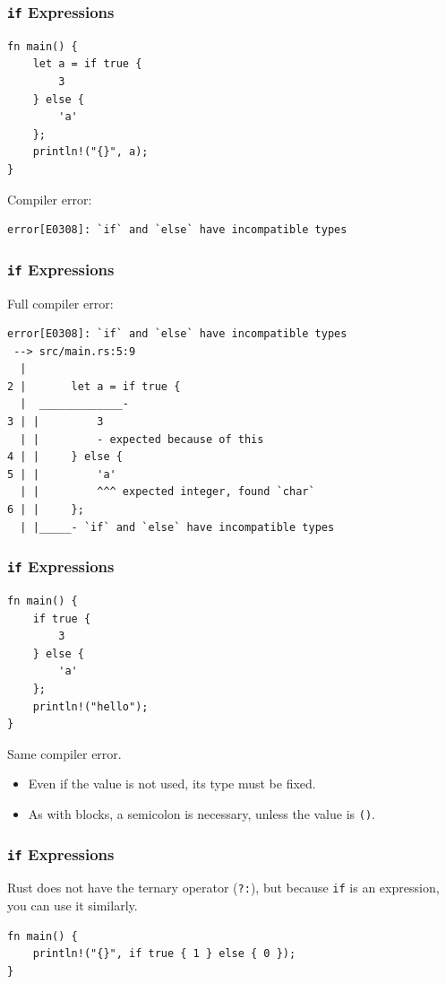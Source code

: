 \begin{frame}[fragile]
    \frametitle{\texttt{if} Expressions}
    \begin{verbatim}
fn main() {
    let a = if true {
        3
    } else {
        'a'
    };
    println!("{}", a);
}
    \end{verbatim}
    \pause
    \vfill
    Compiler error:
    \begin{verbatim}
error[E0308]: `if` and `else` have incompatible types
    \end{verbatim}
\end{frame}

\begin{frame}[fragile]
    \frametitle{\texttt{if} Expressions}
    Full compiler error:
    \begin{verbatim}
error[E0308]: `if` and `else` have incompatible types
 --> src/main.rs:5:9
  |
2 |       let a = if true {
  |  _____________-
3 | |         3
  | |         - expected because of this
4 | |     } else {
5 | |         'a'
  | |         ^^^ expected integer, found `char`
6 | |     };
  | |_____- `if` and `else` have incompatible types
    \end{verbatim}
\end{frame}

\begin{frame}[fragile]
    \frametitle{\texttt{if} Expressions}
    \begin{verbatim}
fn main() {
    if true {
        3
    } else {
        'a'
    };
    println!("hello");
}
    \end{verbatim}
    \pause
    \vfill
    Same compiler error.
    \pause
    \vfill
    \begin{itemize}
        \item Even if the value is not used, its type must be fixed.
        \pause
        \vfill
        \item As with blocks, a semicolon is necessary, unless the value is \texttt{()}.
    \end{itemize}
\end{frame}

\begin{frame}[fragile]
    \frametitle{\texttt{if} Expressions}
    Rust does not have the ternary operator (\texttt{?:}), but because \texttt{if} is an expression, you can use it similarly.
    \pause
    \vfill
    \begin{verbatim}
fn main() {
    println!("{}", if true { 1 } else { 0 });
}
    \end{verbatim}
\end{frame}

